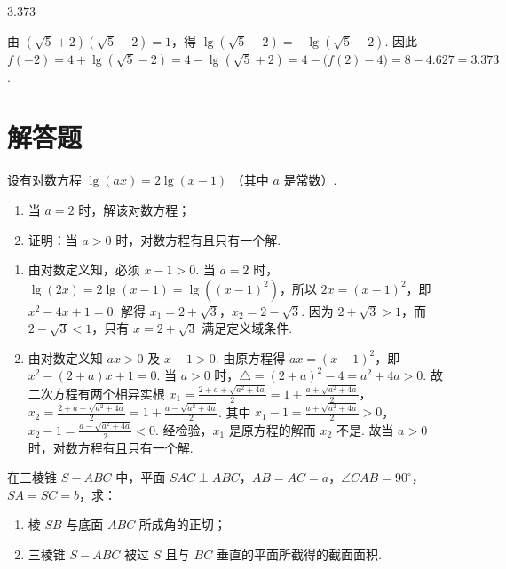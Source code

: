 \begin{answer}
\(3.373\)
\end{answer}

\begin{solution}
由 \(\left(\sqrt{5}+2\right)\left(\sqrt{5}-2\right)=1\)，得 \(\lg\left(\sqrt{5}-2\right)=-\lg\left(\sqrt{5}+2\right)\). 因此
\(
f(-2)=4+\lg\left(\sqrt{5}-2\right)=4-\lg\left(\sqrt{5}+2\right)=4-\bigl(f(2)-4\bigr)=8-4.627=3.373
\).
\end{solution}


\section{解答题}

\begin{problem}

设有对数方程 \(\lg (ax) = 2\lg (x - 1)\) （其中 \(a\) 是常数）.

\begin{enumerate}
\item 当 \(a = 2\) 时，解该对数方程；
\item 证明：当 \(a > 0\) 时，对数方程有且只有一个解.
\end{enumerate}
\end{problem}

\begin{solution}
\begin{enumerate}
\item 由对数定义知，必须 \(x-1>0\). 当 \(a=2\) 时，\(\lg(2x)=2\lg(x-1)=\lg\left((x-1)^2\right)\)，所以 \(2x=(x-1)^2\)，即 \(x^2-4x+1=0\). 解得 \(x_1=2+\sqrt{3}\)，\(x_2=2-\sqrt{3}\). 因为 \(2+\sqrt{3}>1\)，而 \(2-\sqrt{3}<1\)，只有 \(x=2+\sqrt{3}\) 满足定义域条件.

\item 由对数定义知 \(ax>0\) 及 \(x-1>0\). 由原方程得 \(ax=(x-1)^2\)，即 \(x^2-(2+a)x+1=0\). 当 \(a>0\) 时，\(\triangle=(2+a)^2-4=a^2+4a>0\). 故二次方程有两个相异实根 \(x_1=\frac{2+a+\sqrt{a^2+4a}}{2}=1+\frac{a+\sqrt{a^2+4a}}{2}\)，\(x_2=\frac{2+a-\sqrt{a^2+4a}}{2}=1+\frac{a-\sqrt{a^2+4a}}{2}\). 其中 \(x_1-1=\frac{a+\sqrt{a^2+4a}}{2}>0\)，\(x_2-1=\frac{a-\sqrt{a^2+4a}}{2}<0\). 经检验，\(x_1\) 是原方程的解而 \(x_2\) 不是. 故当 \(a>0\) 时，对数方程有且只有一个解.
\end{enumerate}

\end{solution}


\begin{problem}

在三棱锥 \(S-ABC\) 中，平面 \(SAC \perp ABC\)，\(AB=AC=a\)，\(\angle CAB=90^{\circ}\)，\(SA=SC=b\)，求：

\begin{enumerate}
\item 棱 \(SB\) 与底面 \(ABC\) 所成角的正切；
\item 三棱锥 \(S-ABC\) 被过 \(S\) 且与 \(BC\) 垂直的平面所截得的截面面积.
\end{enumerate}

\end{problem}

